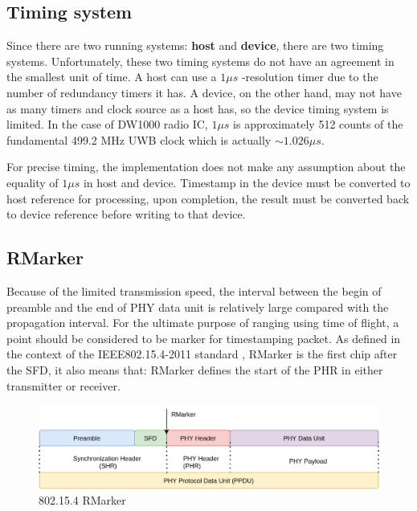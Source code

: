 \documentclass[\main/main.tex]{subfiles}
\begin{document}
\subsection{Timing system}
Since there are two running systems: \textbf{host} and \textbf{device}, there are two timing systems. Unfortunately, these two timing systems do not have an agreement in the smallest unit of time. A host can use a $1\mu s$ -resolution timer due to the number of redundancy timers it has. A device, on the other hand, may not have as many timers and clock source as a host has, so the device timing system is limited. In the case of DW1000 radio IC, $1\mu s$ is approximately 512 counts of the fundamental 499.2 MHz UWB clock which is actually \textbf{$\sim 1.026\mu s$}. 

For precise timing, the implementation does not make any assumption about the equality of $1\mu s$ in host and device. Timestamp in the device must be converted to host reference for processing, upon completion, the result must be converted back to device reference before writing to that device. 
\subsection{RMarker}
Because of the limited transmission speed, the interval between the begin of preamble and the end of PHY data unit is relatively large compared with the propagation interval. For the ultimate purpose of ranging using time of flight, a point should be considered to be marker for timestamping packet. As defined in the context of the IEEE802.15.4-2011 standard \cite{IEEE_Std_802.15.4-2011}, RMarker is the first chip after the SFD, it also means that: RMarker defines the start of the PHR in either transmitter or receiver. 

\begin{figure}[H]
    \begin{center}
        \includegraphics[scale=0.3]{802_15_4_physical.png}
    \end{center}
    \caption{802.15.4 RMarker}
    \label{fig:802_15_4_rmarker}
\end{figure}
\end{document}
